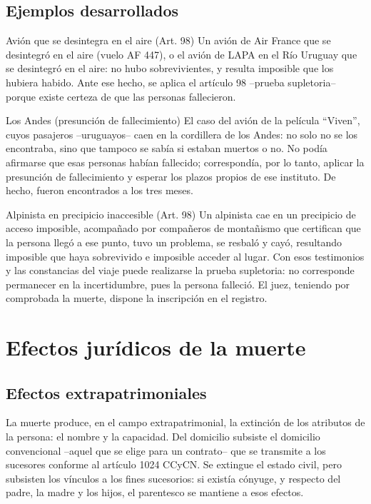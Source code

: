 \documentclass[12pt,oneside]{book}
\begin{document}
\subsection{Ejemplos desarrollados}

\begin{example}{Avión que se desintegra en el aire (Art. 98)}
Un avión de Air France que se desintegró en el aire (vuelo AF 447), o el avión de LAPA en el Río Uruguay que se desintegró en el aire: no hubo sobrevivientes, y resulta imposible que los hubiera habido. Ante ese hecho, se aplica el artículo 98 --prueba supletoria-- porque existe certeza de que las personas fallecieron.
\end{example}

\begin{example}{Los Andes (presunción de fallecimiento)}
El caso del avión de la película ``Viven'', cuyos pasajeros --uruguayos-- caen en la cordillera de los Andes: no solo no se los encontraba, sino que tampoco se sabía si estaban muertos o no. No podía afirmarse que esas personas habían fallecido; correspondía, por lo tanto, aplicar la presunción de fallecimiento y esperar los plazos propios de ese instituto. De hecho, fueron encontrados a los tres meses.
\end{example}

\begin{example}{Alpinista en precipicio inaccesible (Art. 98)}
Un alpinista cae en un precipicio de acceso imposible, acompañado por compañeros de montañismo que certifican que la persona llegó a ese punto, tuvo un problema, se resbaló y cayó, resultando imposible que haya sobrevivido e imposible acceder al lugar. Con esos testimonios y las constancias del viaje puede realizarse la prueba supletoria: no corresponde permanecer en la incertidumbre, pues la persona falleció. El juez, teniendo por comprobada la muerte, dispone la inscripción en el registro.
\end{example}

\section{Efectos jurídicos de la muerte}

\subsection{Efectos extrapatrimoniales}

La muerte produce, en el campo extrapatrimonial, la extinción de los atributos de la persona: el nombre y la capacidad. Del domicilio subsiste el domicilio convencional --aquel que se elige para un contrato-- que se transmite a los sucesores conforme al artículo 1024 CCyCN. Se extingue el estado civil, pero subsisten los vínculos a los fines sucesorios: si existía cónyuge, y respecto del padre, la madre y los hijos, el parentesco se mantiene a esos efectos.
\end{document}
